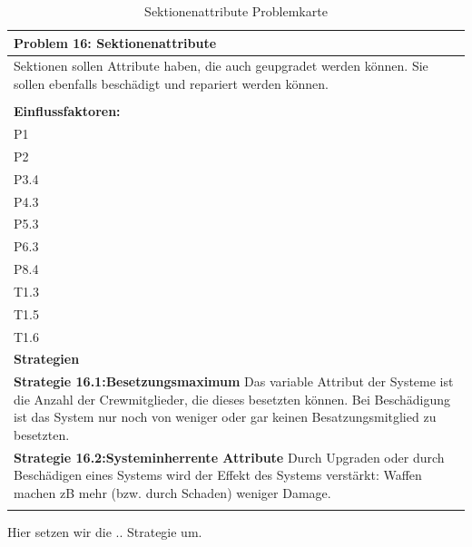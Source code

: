 \documentclass[fontsize=12pt,paper=a4,twoside]{scrartcl}
\begin{document}
\begin{table}[H]
    \centering
    \begin{tabular}{|p{15cm}|}
    \hline
          \textbf{Problem 16: Sektionenattribute}  \\ \hline
	Sektionen sollen Attribute haben, die auch geupgradet werden können. Sie sollen ebenfalls beschädigt und repariert werden können. \\
         \\ \hline
          \textbf{Einflussfaktoren: } \\
	P1 \\
	P2 \\
	P3.4 \\
	P4.3 \\
	P5.3 \\
	P6.3 \\
	P8.4 \\
	T1.3 \\
	T1.5 \\
	T1.6 \\
          \hline
          \textbf{Strategien} \\ \hline
            {}          
           \label{strategie:16.1}     
          \textbf{Strategie 16.1:Besetzungsmaximum} Das variable Attribut der Systeme ist die Anzahl der Crewmitglieder, die dieses besetzten können. Bei Beschädigung ist das System nur noch von weniger oder gar keinen Besatzungsmitglied zu besetzten.  \\        
  {}          
           \label{strategie:16.2}              
          \textbf{Strategie 16.2:Systeminherrente Attribute} Durch Upgraden oder durch Beschädigen eines Systems wird der Effekt des Systems verstärkt: Waffen machen zB mehr (bzw. durch Schaden) weniger Damage.  \\
	 \\ \hline
    \end{tabular}

    \caption{Sektionenattribute Problemkarte}
    \label{tab:ProblemKarte16}
\end{table}
Hier setzen wir die .. Strategie um.\\
\end{document}
